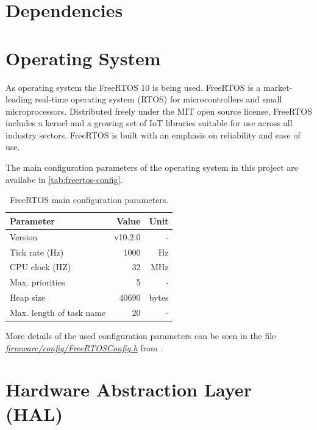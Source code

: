 \section{Dependencies}

\section{Operating System}

As operating system the FreeRTOS 10 \cite{freertos} is being used. FreeRTOS is a market-leading real-time operating system (RTOS) for microcontrollers and small microprocessors. Distributed freely under the MIT open source license, FreeRTOS includes a kernel and a growing set of IoT libraries suitable for use across all industry sectors. FreeRTOS is built with an emphasis on reliability and ease of use.

The main configuration parameters of the operating system in this project are availabe in \autoref{tab:freertos-config}.

\begin{table}[!h]
    \centering
    \begin{tabular}{lrr}
        \toprule[1.5pt]
        \textbf{Parameter}       & \textbf{Value} & \textbf{Unit} \\
        \midrule
        Version                  & v10.2.0        & - \\
        Tick rate (Hz)           & 1000           & Hz \\
        CPU clock (HZ)           & 32             & MHz \\
        Max. priorities          & 5              & - \\
        Heap size                & 40690          & bytes \\
        Max. length of task name & 20             & - \\
        \bottomrule[1.5pt]
    \end{tabular}
    \caption{FreeRTOS main configuration parameters.}
    \label{tab:freertos-config}
\end{table}

More details of the used configuration parameters can be seen in the file \textit{\href{https://github.com/spacelab-ufsc/eps2/blob/master/firmware/config/FreeRTOSConfig.h}{firmware/config/FreeRTOSConfig.h}} from \cite{eps2}.

\section{Hardware Abstraction Layer (HAL)}

